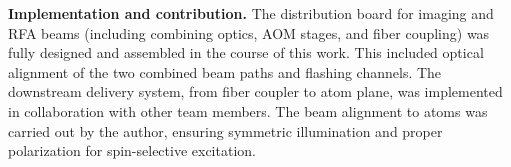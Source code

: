 \textbf{Implementation and contribution.}  
The distribution board for imaging and RFA beams (including combining optics, AOM stages, and fiber coupling) was fully designed and assembled in the course of this work. This included optical alignment of the two combined beam paths and flashing channels. The downstream delivery system, from fiber coupler to atom plane, was implemented in collaboration with other team members. The beam alignment to atoms was carried out by the author, ensuring symmetric illumination and proper polarization for spin-selective excitation.
